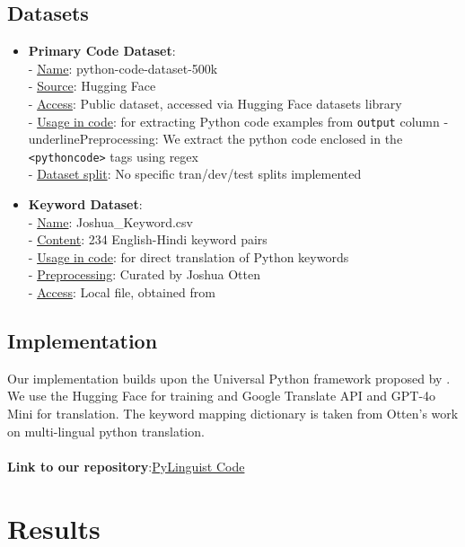 \documentclass[11pt,a4paper]{article}
\begin{document}
\subsection{Datasets}
\begin{itemize}[itemsep=0pt, topsep=0pt]
    \item \textbf{Primary Code Dataset}:\\ 
    - \underline{Name}: python-code-dataset-500k\\
    - \underline{Source}: Hugging Face \cite{jtatman2021python}\\
    - \underline{Access}: Public dataset, accessed via Hugging Face datasets library\\
    - \underline{Usage in code}: for extracting Python code examples from \texttt{output} column
    - underline{Preprocessing}: We extract the python code enclosed in the \texttt{<pythoncode>} tags using regex\\ 
    - \underline{Dataset split}: No specific tran/dev/test splits implemented
    \item \textbf{Keyword Dataset}:\\
    - \underline{Name}: Joshua\_Keyword.csv\\
    - \underline{Content}: 234 English-Hindi keyword pairs\\
    - \underline{Usage in code}: for direct translation of Python keywords\\
    - \underline{Preprocessing}: Curated by Joshua Otten \cite{otten-etal-23-unipy}\\
    - \underline{Access}: Local file, obtained from \cite{otten2023unipy}
\end{itemize}

\subsection{Implementation} 
Our implementation builds upon the Universal Python framework proposed by \cite{otten2023unipy}. We use the Hugging Face \cite{jtatman2021python} for training and Google Translate API \cite{googletranslateapi} and GPT-4o Mini \cite{gpt4omini} for translation. The keyword mapping dictionary is taken from Otten's work \cite{otten-etal-23-unipy} on multi-lingual python translation.\\ \\ 
\textbf{Link to our repository}:\href{https://github.com/StringAna/PyLinguist/blob/main/code_trials/Project.ipynb}{PyLinguist Code}

\section{Results}
\end{document}
